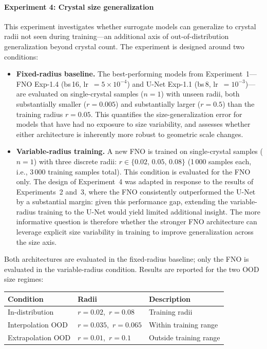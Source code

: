 \paragraph{Experiment 4: Crystal size generalization}
This experiment investigates whether surrogate models can generalize to crystal radii not seen during training—an additional axis of out-of-distribution generalization beyond crystal count. The experiment is designed around two conditions:

\begin{itemize}
    \item \textbf{Fixed-radius baseline.} The best-performing models from Experiment~1—FNO Exp-1.4 (bs\,16, lr~$=5\times10^{-4}$) and U-Net Exp-1.1 (bs\,8, lr~$=10^{-3}$)—are evaluated on single-crystal samples ($n=1$) with unseen radii, both substantially smaller ($r = 0.005$) and substantially larger ($r = 0.5$) than the training radius $r = 0.05$. This quantifies the size-generalization error for models that have had no exposure to size variability, and assesses whether either architecture is inherently more robust to geometric scale changes.

    \item \textbf{Variable-radius training.} A new FNO is trained on single-crystal samples ($n = 1$) with three discrete radii: $r \in \{0.02,\, 0.05,\, 0.08\}$ (1\,000 samples each, i.e., 3\,000 training samples total). This condition is evaluated for the FNO only. The design of Experiment~4 was adapted in response to the results of Experiments~2 and~3, where the FNO consistently outperformed the U-Net by a substantial margin: given this performance gap, extending the variable-radius training to the U-Net would yield limited additional insight. The more informative question is therefore whether the stronger FNO architecture can leverage explicit size variability in training to improve generalization across the size axis.
\end{itemize}

Both architectures are evaluated in the fixed-radius baseline; only the FNO is evaluated in the variable-radius condition. Results are reported for the two OOD size regimes:

\begin{center}
\begin{tabular}{lll}
\toprule
\textbf{Condition} & \textbf{Radii} & \textbf{Description} \\
\midrule
In-distribution     & $r = 0.02$,\ $r = 0.08$  & Training radii \\
Interpolation OOD   & $r = 0.035$,\ $r = 0.065$ & Within training range \\
Extrapolation OOD   & $r = 0.01$,\ $r = 0.1$    & Outside training range \\
\bottomrule
\end{tabular}
\end{center}

